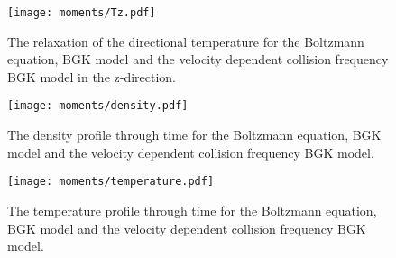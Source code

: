 %
\begin{figure}[h!]
\centering
\texttt{[image: moments/Tz.pdf]}
\caption{\label{DirTempz} The relaxation of the directional temperature for the Boltzmann equation, BGK model and the velocity dependent collision frequency BGK model in the z-direction.}
\end{figure}
%
\begin{figure}[h!]
\centering
\texttt{[image: moments/density.pdf]}
\caption{\label{Den} The density profile through time for the Boltzmann equation, BGK model and the velocity dependent collision frequency BGK model.}
\end{figure}
%
\begin{figure}[h!]
\centering
\texttt{[image: moments/temperature.pdf]}
\caption{\label{Temp} The temperature profile through time for the Boltzmann equation, BGK model and the velocity dependent collision frequency BGK model.}
\end{figure}
%
\FloatBarrier
%
%
%
%
%
